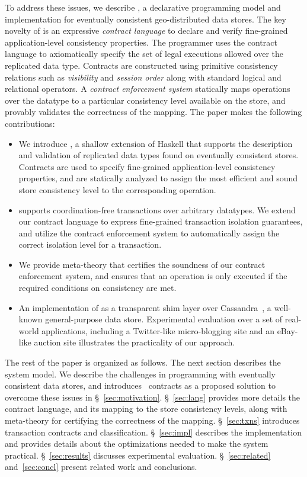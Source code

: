 To address these issues, we describe \name, a declarative programming model and
implementation for eventually consistent geo-distributed data stores. The key
novelty of \name is an expressive \emph{contract language} to declare and
verify fine-grained application-level consistency properties. The programmer
uses the contract language to axiomatically specify the set of legal executions
allowed over the replicated data type. Contracts are constructed using
primitive consistency relations such as \emph{visibility} and \emph{session
order} along with standard logical and relational operators. A \emph{contract
enforcement system} statically maps operations over the datatype to a
particular consistency level available on the store, and provably validates the
correctness of the mapping. The paper makes the following contributions:

\begin{itemize}
\setlength{\itemsep}{2pt}
\item We introduce \name, a shallow extension of Haskell that supports the
	description and validation of replicated data types found on eventually
	consistent stores. Contracts are used to specify fine-grained
	application-level consistency properties, and are statically analyzed to
	assign the most efficient and sound store consistency level to the
	corresponding operation.
\item \name supports coordination-free transactions over arbitrary datatypes.
	We extend our contract language to express fine-grained transaction isolation
	guarantees, and utilize the contract enforcement system to automatically
	assign the correct isolation level for a transaction.
\item We provide meta-theory that certifies the soundness of our contract
	enforcement system, and ensures that an operation is only executed if the
	required conditions on consistency are met.
\item An implementation of \name as a transparent shim layer over
	Cassandra~\cite{Cassandra}, a well-known general-purpose data store.
	Experimental evaluation over a set of real-world applications, including a
	Twitter-like micro-blogging site and an eBay-like auction site illustrates
	the practicality of our approach.
\end{itemize}

The rest of the paper is organized as follows. The next section describes the
system model.  We describe the challenges in programming with eventually
consistent data stores, and introduces \name\ contracts as a proposed solution
to overcome these issues in \S~\ref{sec:motivation}. \S~\ref{sec:lang} provides
more details the contract language, and its mapping to the store consistency
levels, along with meta-theory for certifying the correctness of the mapping.
\S~\ref{sec:txns} introduces transaction contracts and classification.
\S~\ref{sec:impl} describes the implementation and provides details about the
optimizations needed to make the system practical. \S~\ref{sec:results}
discusses experimental evaluation. \S~\ref{sec:related} and~\ref{sec:concl}
present related work and conclusions.
